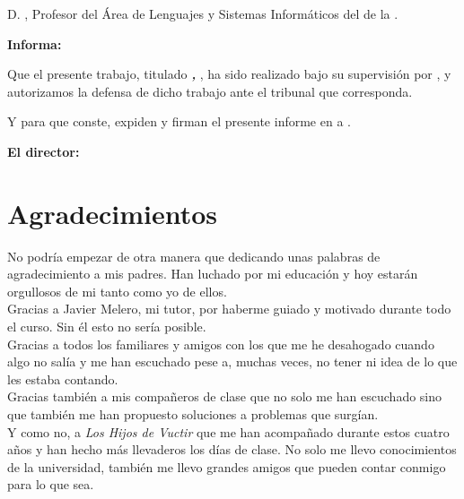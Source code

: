 D. \textbf{\myProf}, Profesor del Área de Lenguajes y Sistemas Informáticos del \myDepartment de la \myUni.

\vspace{0.5cm}

\textbf{Informa:}

\vspace{0.5cm}

Que el presente trabajo, titulado \textit{\textbf{\myTitle, \mySubtitle}}, ha sido realizado bajo su supervisión por \textbf{\myName}, y autorizamos la defensa de dicho trabajo ante el tribunal que corresponda.

\vspace{0.5cm}

Y para que conste, expiden y firman el presente informe en \myLocation a \myTime.

\vspace{1cm}

\textbf{El director:}

\vspace{5cm}

\noindent \textbf{\myProf}

\chapter*{Agradecimientos}
\thispagestyle{empty}

\vspace{1cm}

No podría empezar de otra manera que dedicando unas palabras de agradecimiento a mis padres. Han luchado por mi educación y hoy estarán orgullosos de mi tanto como yo de ellos.
\\

Gracias a Javier Melero, mi tutor, por haberme guiado y motivado durante todo el curso. Sin él esto no sería posible.
\\

Gracias a todos los familiares y amigos con los que me he desahogado cuando algo no salía y me han escuchado pese a, muchas veces, no tener ni idea de lo que les estaba contando.
\\

Gracias también a mis compañeros de clase que no solo me han escuchado sino que también me han propuesto soluciones a problemas que surgían.
\\

Y como no, a \textit{Los Hijos de Vuctir} que me han acompañado durante estos cuatro años y han hecho más llevaderos los días de clase. No solo me llevo conocimientos de la universidad, también me llevo grandes amigos que pueden contar conmigo para lo que sea.